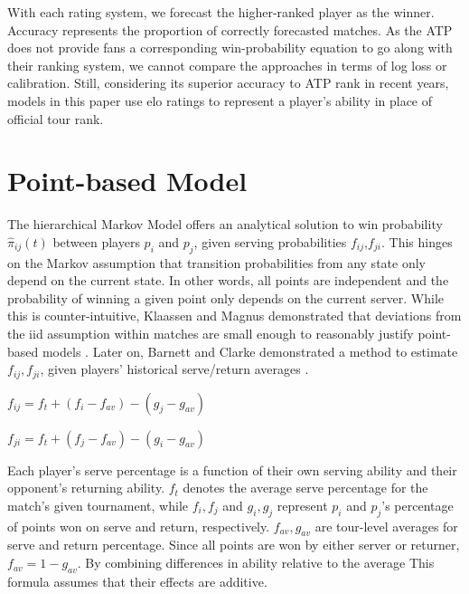 \documentclass[chapterprefix=false]{report}
\begin{document}
With each rating system, we forecast the higher-ranked player as the winner. Accuracy represents the proportion of correctly forecasted matches. As the ATP does not provide fans a corresponding win-probability equation to go along with their ranking system, we cannot compare the approaches in terms of log loss or calibration. Still, considering its superior accuracy to ATP rank in recent years, models in this paper use elo ratings to represent a player's ability in place of official tour rank.

\section{Point-based Model}
The hierarchical Markov Model offers an analytical solution to win probability $\hat{\pi}_{ij}(t)$ between players $p_i$ and $p_j$, given serving probabilities $f_{ij}$,$f_{ji}$. This hinges on the Markov assumption that transition probabilities from any state only depend on the current state. In other words, all points are independent and the probability of winning a given point only depends on the current server. While this is counter-intuitive, Klaassen and Magnus demonstrated that deviations from the iid assumption within matches are small enough to reasonably justify point-based models \cite{KlaassenandMagnus2001}. Later on, Barnett and Clarke demonstrated a method to estimate $f_{ij},f_{ji}$, given players' historical serve/return averages \cite{BarnettandClarke2005}.



\begin{center}
$f_{ij} = f_t + (f_i-f_{av})-(g_j-g_{av})$

$f_{ji} = f_t + (f_j-f_{av})-(g_i-g_{av})$
\end{center}

Each player's serve percentage is a function of their own serving ability and their opponent's returning ability. $f_t$ denotes the average serve percentage for the match's given tournament, while $f_i,f_j$ and $g_i,g_j$ represent $p_i$ and $p_j$'s percentage of points won on serve and return, respectively. $f_{av},g_{av}$ are tour-level averages for serve and return percentage. Since all points are won by either server or returner, $f_{av} =1-g_{av}$. By combining differences in ability relative to the average This formula assumes that their effects are additive.
\end{document}
